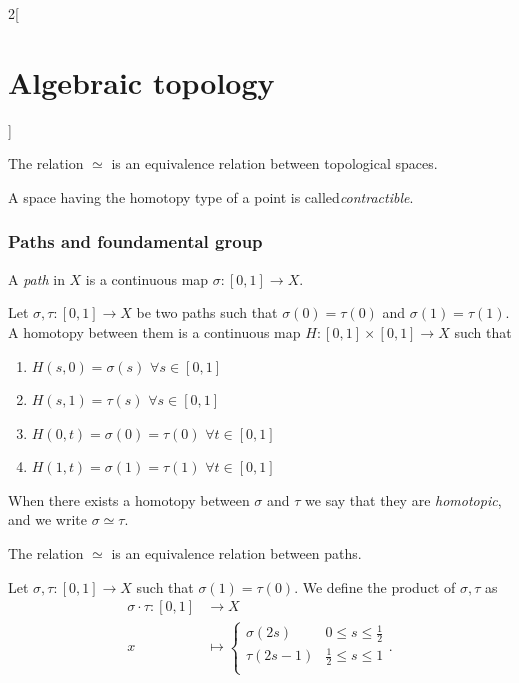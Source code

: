 \documentclass[../../../main.tex]{subfiles}
\begin{document}
\begin{multicols}{2}[\section{Algebraic topology}]
  	\begin{proposition}
		The relation $\simeq$ is an equivalence relation between topological spaces.
	\end{proposition}

	\begin{definition}
		A space having the homotopy type of a point is called\emph{contractible}.
	\end{definition}
	
	\subsubsection{Paths and foundamental group}
	
	\begin{definition}
		A \emph{path} in $X$ is a continuous map $\sigma:[0,1]\to X$.
	\end{definition}

	\begin{definition}
		Let $\sigma, \tau : [0,1]\to X$ be two paths such that $\sigma(0)=\tau(0)$ and $\sigma(1)=\tau(1)$. A homotopy between them is a continuous map $H:[0,1]\times [0,1] \to X$ such that
		\begin{enumerate}
			\item $H(s,0)=\sigma(s) $ $\forall s\in [0,1]$
			\item $H(s,1)=\tau(s)$ $\forall s\in [0,1]$
			\item $H(0,t)=\sigma(0)=\tau(0)$ $\forall t\in [0,1]$
			\item $H(1,t)=\sigma(1)=\tau(1)$ $\forall t\in [0,1]$
		\end{enumerate}
	When there exists a homotopy between $\sigma$ and $\tau$ we say that they are \emph{homotopic}, and we write $\sigma \simeq \tau $.
	\end{definition}

	\begin{proposition}
		The relation $\simeq$ is an equivalence relation between paths.
	\end{proposition}

	\begin{definition}
		Let $\sigma, \tau: [0,1] \to X$ such that $\sigma(1)=\tau(0)$. We define the product of $\sigma, \tau$ as 
		\begin{align*}
			\sigma \cdot \tau: [0,1] &\longrightarrow X \\
			x&\longmapsto \begin{cases}
				\sigma(2s) & 0\leq s \leq \frac{1}{2}\\
				\tau(2s-1)  & \frac{1}{2}\leq s \leq 1\\
			\end{cases}.
		\end{align*}
	

\end{definition}
\end{multicols}
\end{document}
